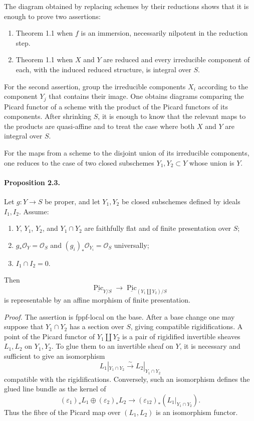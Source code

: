 \documentclass[12pt]{article}
\newcommand{\cO}{\mathcal O}
\newcommand{\Pic}{\operatorname{Pic}}
\newcommand{\longto}{\longrightarrow}
\newcommand{\iso}{\xrightarrow{\sim}}
\begin{document}
The diagram obtained by replacing schemes by their reductions shows that it is enough to prove two assertions:

\begin{enumerate}[label=\Roman*.]
\item Theorem 1.1 when $f$ is an immersion, necessarily nilpotent in the reduction step.
\item Theorem 1.1 when $X$ and $Y$ are reduced and every irreducible component of each, with the induced reduced structure, is integral over $S$.
\end{enumerate}

For the second assertion, group the irreducible components $X_i$ according to the component $Y_j$ that contains their image. One obtains diagrams comparing the Picard functor of a scheme with the product of the Picard functors of its components. After shrinking $S$, it is enough to know that the relevant maps to the products are quasi-affine and to treat the case where both $X$ and $Y$ are integral over $S$.

For the maps from a scheme to the disjoint union of its irreducible components, one reduces to the case of two closed subschemes $Y_1,Y_2\subset Y$ whose union is $Y$.

\paragraph{Proposition 2.3.}
Let $g:Y\to S$ be proper, and let $Y_1,Y_2$ be closed subschemes defined by ideals $I_1,I_2$. Assume:
\begin{enumerate}[label=\alph*)]
\item $Y$, $Y_1$, $Y_2$, and $Y_1\cap Y_2$ are faithfully flat and of finite presentation over $S$;
\item $g_*\cO_Y=\cO_S$ and $(g_i)_*\cO_{Y_i}=\cO_S$ universally;
\item $I_1\cap I_2=0$.
\end{enumerate}
Then
\[
\underline{\Pic}_{Y/S}\longto
\underline{\Pic}_{(Y_1\amalg Y_2)/S}
\]
is representable by an affine morphism of finite presentation.

\emph{Proof.}
The assertion is fppf-local on the base. After a base change one may suppose that $Y_1\cap Y_2$ has a section over $S$, giving compatible rigidifications. A point of the Picard functor of $Y_1\amalg Y_2$ is a pair of rigidified invertible sheaves $L_1,L_2$ on $Y_1,Y_2$. To glue them to an invertible sheaf on $Y$, it is necessary and sufficient to give an isomorphism
\[
L_1|_{Y_1\cap Y_2}\iso L_2|_{Y_1\cap Y_2}
\]
compatible with the rigidifications. Conversely, such an isomorphism defines the glued line bundle as the kernel of
\[
(\varepsilon_1)_*L_1\oplus(\varepsilon_2)_*L_2
\longto
(\varepsilon_{12})_*(L_1|_{Y_1\cap Y_2}).
\]
Thus the fibre of the Picard map over $(L_1,L_2)$ is an isomorphism functor.
\end{document}
